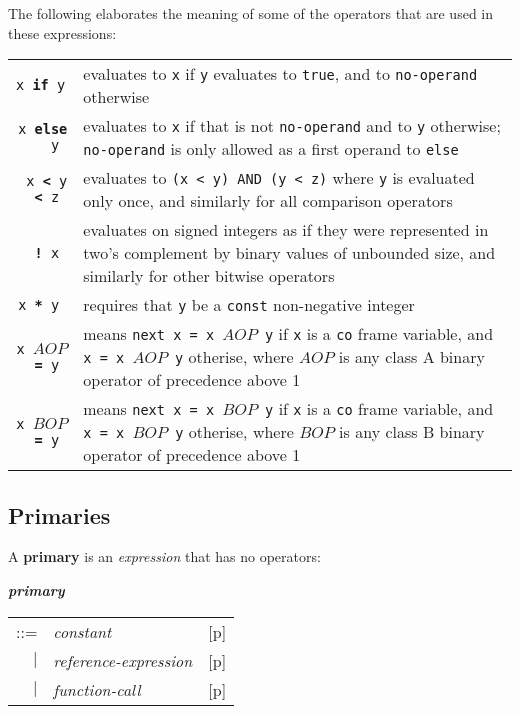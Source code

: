 \documentclass[12pt]{article}
\newcommand{\TT}[1]{{\tt \bfseries #1}}
\newcommand{\key}[1]{{\rm \bfseries #1}}
\newcommand{\emkey}[1]{{\em \bfseries #1}}
\newcommand{\pagref}[1]{p\pageref{#1}}
\newenvironment{indpar}[1][0.3in]%
	{\begin{list}{}%
		     {\setlength{\itemsep}{0in}%
		      \setlength{\topsep}{0in}%
		      \setlength{\parsep}{1ex}%
		      \setlength{\labelwidth}{#1}%
		      \setlength{\leftmargin}{#1}%
		      \addtolength{\leftmargin}{\labelsep}}%
	 \item}%
	{\end{list}}
\begin{document}
The following elaborates the meaning of some of the operators
that are used in these expressions:

\begin{indpar}
\begin{tabular}{rp{5.0in}}
\tt x \TT{if} y & evaluates to {\tt x} if {\tt y} evaluates to {\tt true},
                  and to {\tt no-operand} otherwise
\\[0.5ex]
\tt x \TT{else} y & evaluates to {\tt x} if that is not {\tt no-operand}
                  and to {\tt y} otherwise; {\tt no-operand} is only
		  allowed as a first operand to {\tt else}
\\[0.5ex]
\tt x \TT{<} y \TT{<} z & evaluates to {\tt (x < y) AND (y < z)} where
                  {\tt y} is evaluated only once, and similarly for
		  all comparison operators
\\[0.5ex]
\tt \TT{!} x & evaluates on signed integers as if they were represented
               in two's complement by binary values of unbounded size,
	       and similarly for other bitwise operators
\\[0.5ex]
\tt x \TT{**} y & requires that {\tt y} be a {\tt const} non-negative integer
\\[0.5ex]
\tt x $AOP$\TT{=} y & means {\tt next x = x $AOP$ y} if {\tt x}
is a {\tt co} frame variable, and {\tt x = x $AOP$ y} otherise,
where $AOP$ is any class A binary operator of precedence above 1
\\[0.5ex]
\tt x $BOP$\TT{=} y & means {\tt next x = x $BOP$ y} if {\tt x}
is a {\tt co} frame variable, and {\tt x = x $BOP$ y} otherise,
where $BOP$ is any class B binary operator of precedence above 1
\end{tabular}
\end{indpar}

\subsection{Primaries}

A \key{primary} is an {\em expression} that has no operators:
\begin{indpar}
\emkey{primary}
    \begin{tabular}[t]{@{}rll}
    ::= & {\em constant}		& [\pagref{CONSTANTS}] \\
    $|$ & {\em reference-expression}
                                        & [\pagref{REFERENCE-EXPRESSIONS}] \\
    $|$ & {\em function-call}		& [\pagref{FUNCTION-CALLS}] \\
    \end{tabular}
\end{indpar}
\end{document}
